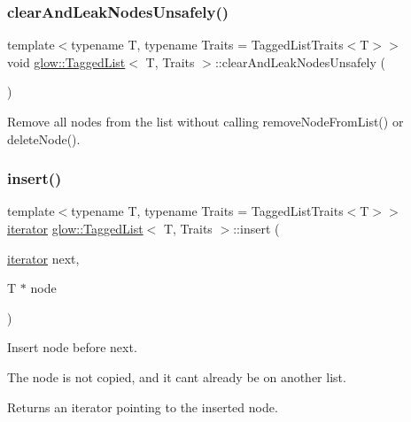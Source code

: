 \subsubsection{\texorpdfstring{clear\+And\+Leak\+Nodes\+Unsafely()}{clearAndLeakNodesUnsafely()}}
{\footnotesize\ttfamily template$<$typename T, typename Traits = Tagged\+List\+Traits$<$\+T$>$$>$ \\
void \hyperlink{classglow_1_1_tagged_list}{glow\+::\+Tagged\+List}$<$ T, Traits $>$\+::clear\+And\+Leak\+Nodes\+Unsafely (\begin{DoxyParamCaption}{ }\end{DoxyParamCaption})\hspace{0.3cm}{\ttfamily [inline]}}

Remove all nodes from the list without calling remove\+Node\+From\+List() or delete\+Node(). \mbox{\label{classglow_1_1_tagged_list_a12dbae092e95c3562261f30b7021ec2e}} 
\subsubsection{\texorpdfstring{insert()}{insert()}}
{\footnotesize\ttfamily template$<$typename T, typename Traits = Tagged\+List\+Traits$<$\+T$>$$>$ \\
\hyperlink{classglow_1_1tagged__list__details_1_1_iterator}{iterator} \hyperlink{classglow_1_1_tagged_list}{glow\+::\+Tagged\+List}$<$ T, Traits $>$\+::insert (\begin{DoxyParamCaption}\item[{\hyperlink{classglow_1_1tagged__list__details_1_1_iterator}{iterator}}]{next,  }\item[{T $\ast$}]{node }\end{DoxyParamCaption})\hspace{0.3cm}{\ttfamily [inline]}}

Insert {\ttfamily node} before {\ttfamily next}.

The node is not copied, and it can\textquotesingle{}t already be on another list.

Returns an iterator pointing to the inserted node. \mbox{\label{classglow_1_1_tagged_list_ac6e5699b5c9c7d3a01e144185b22bb72}} 
